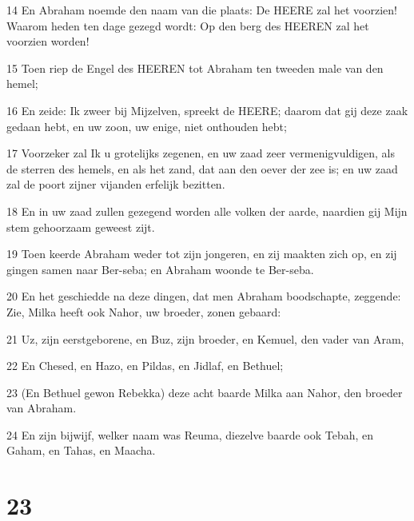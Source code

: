 \par 14 En Abraham noemde den naam van die plaats: De HEERE zal het voorzien! Waarom heden ten dage gezegd wordt: Op den berg des HEEREN zal het voorzien worden!
\par 15 Toen riep de Engel des HEEREN tot Abraham ten tweeden male van den hemel;
\par 16 En zeide: Ik zweer bij Mijzelven, spreekt de HEERE; daarom dat gij deze zaak gedaan hebt, en uw zoon, uw enige, niet onthouden hebt;
\par 17 Voorzeker zal Ik u grotelijks zegenen, en uw zaad zeer vermenigvuldigen, als de sterren des hemels, en als het zand, dat aan den oever der zee is; en uw zaad zal de poort zijner vijanden erfelijk bezitten.
\par 18 En in uw zaad zullen gezegend worden alle volken der aarde, naardien gij Mijn stem gehoorzaam geweest zijt.
\par 19 Toen keerde Abraham weder tot zijn jongeren, en zij maakten zich op, en zij gingen samen naar Ber-seba; en Abraham woonde te Ber-seba.
\par 20 En het geschiedde na deze dingen, dat men Abraham boodschapte, zeggende: Zie, Milka heeft ook Nahor, uw broeder, zonen gebaard:
\par 21 Uz, zijn eerstgeborene, en Buz, zijn broeder, en Kemuel, den vader van Aram,
\par 22 En Chesed, en Hazo, en Pildas, en Jidlaf, en Bethuel;
\par 23 (En Bethuel gewon Rebekka) deze acht baarde Milka aan Nahor, den broeder van Abraham.
\par 24 En zijn bijwijf, welker naam was Reuma, diezelve baarde ook Tebah, en Gaham, en Tahas, en Maacha.

\chapter{23}

